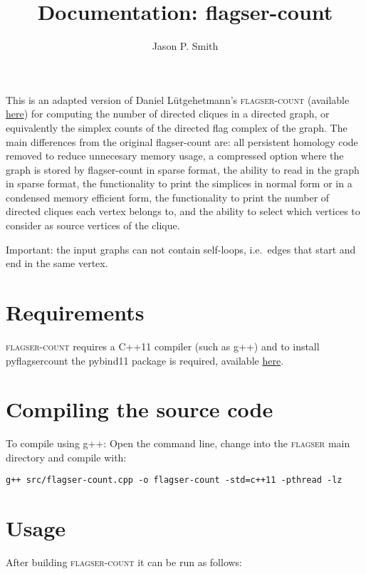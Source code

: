 \documentclass{amsart}
\theoremstyle{definition}
\begin{document}
\title{Documentation: flagser-count}

\author{Jason P. Smith}
\address{University of Aberdeen, Aberdeen, United Kingdom}

\maketitle

\noindent
This is an adapted version of Daniel Lütgehetmann's \textsc{flagser-count} (available \href{https://github.com/luetge/flagser}{here}) for computing
the number of directed cliques in a directed graph, or equivalently the simplex counts of the directed flag complex of the graph.
The main differences from the original flagser-count are: all persistent homology code removed to reduce unnecesary memory usage,
a compressed option where the graph is stored by flagser-count in sparse format,
the ability to read in the graph in sparse format, the functionality to print the simplices in normal form or in a condensed memory efficient form,
the functionality to print the number of directed cliques each vertex belongs to, and the ability to select which vertices to consider as source vertices of the clique.


Important: the input graphs can not contain self-loops, i.e.\ edges that start and end in the same
vertex.

\section{Requirements}
\noindent
\textsc{flagser-count} requires a C++11 compiler (such as g++) and to install pyflagsercount the pybind11 package is required, available \href{https://github.com/pybind/pybind11}{here}.


\section{Compiling the source code}
\noindent
To compile using g++: Open the command line, change into the \textsc{flagser} main directory and compile with:
\vspace{1em}

\begin{verbatim}g++ src/flagser-count.cpp -o flagser-count -std=c++11 -pthread -lz\end{verbatim}

\section{Usage}
\noindent
After building \textsc{flagser-count} it can be run as follows:
\end{document}
